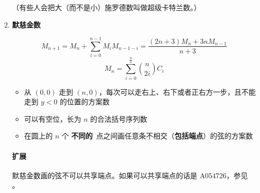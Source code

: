\begin{enumerate}
（有些人会把大（而不是小）施罗德数叫做超级卡特兰数。）

\item \textbf{默慈金数}

$$ M_{n + 1} = M_n + \sum_{i = 0} ^ {n - 1} M_i M_{n - 1 - i} = \frac {(2n + 3)M_n + 3n M_{n - 1}} {n + 3} $$
$$ M_n = \sum_{i = 0} ^ {\frac n 2} {n \choose 2i} C_i $$

\begin{itemize}
	\item 从 $(0, 0)$ 走到 $(n, 0)$，每次可以走右上、右下或者正右方一步，且不能走到 $y<0$ 的位置的方案数
	\item 可以有空位，长为 $n$ 的合法括号序列数
	\item 在圆上的 $n$ 个 \textbf{不同的}\ 点之间画任意条不相交（\textbf{包括端点}）的弦的方案数
\end{itemize}

\paragraph{扩展} 默慈金数画的弦不可以共享端点。如果可以共享端点的话是 A054726，参见 。

\end{enumerate}
